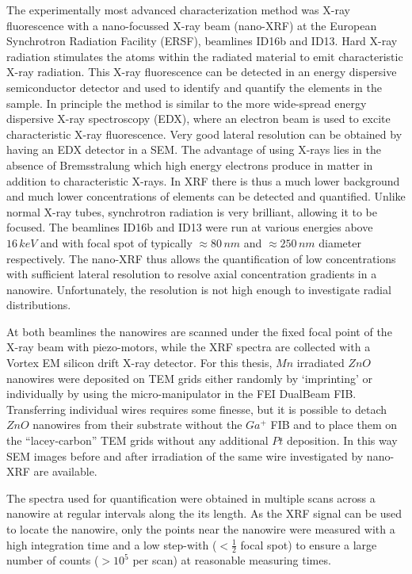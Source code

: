 The experimentally most advanced characterization method was X-ray fluorescence with a nano-focussed X-ray beam (nano-XRF) at the European Synchrotron Radiation Facility (ERSF), beamlines ID16b and ID13. Hard X-ray radiation stimulates the atoms within the radiated material to emit characteristic X-ray radiation. This X-ray fluorescence can be detected in an energy dispersive semiconductor detector and used to identify and quantify the elements in the sample. In principle the method is similar to the more wide-spread energy dispersive X-ray spectroscopy (EDX), where an electron beam is used to excite characteristic X-ray fluorescence. Very good lateral resolution can be obtained by having an EDX detector in a SEM. The advantage of using X-rays lies in the absence of Bremsstralung which high energy electrons produce in matter in addition to characteristic X-rays. In XRF there is thus a much lower background and much lower concentrations of elements can be detected and quantified. Unlike normal X-ray tubes, synchrotron radiation is very brilliant, allowing it to be focused. The beamlines ID16b and ID13 were run at various energies above $16\,keV$ and with focal spot of typically $\approx 80\,nm$ and $\approx 250\,nm$ diameter respectively. The nano-XRF thus allows the quantification of low concentrations with sufficient lateral resolution to resolve axial concentration gradients in a nanowire. Unfortunately, the resolution is not high enough to investigate radial distributions.

At both beamlines the nanowires are scanned under the fixed focal point of the X-ray beam with piezo-motors, while the XRF spectra are collected with a Vortex EM silicon drift X-ray detector. For this thesis, $Mn$ irradiated $ZnO$ nanowires were deposited on TEM grids either randomly by `imprinting' or individually by using the micro-manipulator in the FEI DualBeam FIB. Transferring individual wires requires some finesse, but it is possible to detach $ZnO$ nanowires from their substrate without the $Ga^+$ FIB and to place them on the ``lacey-carbon'' TEM grids without any additional $Pt$ deposition. In this way SEM images before and after irradiation of the same wire investigated by nano-XRF are available.

The spectra used for quantification were obtained in multiple scans across a nanowire at regular intervals along the its length. As the XRF signal can be used to locate the nanowire, only the points near the nanowire were measured with a high integration time and a low step-with ($< \frac{1}{2}$ focal spot) to ensure a large number of counts ($> 10^5$ per scan) at reasonable measuring times.


